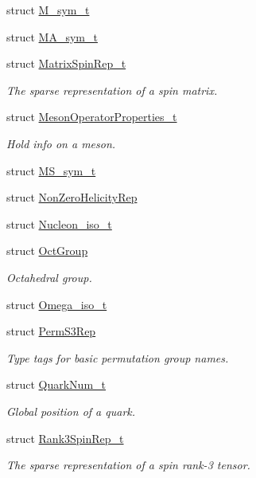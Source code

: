\begin{DoxyCompactItemize}
struct \mbox{\hyperlink{structHadron_1_1M__sym__t}{M\+\_\+sym\+\_\+t}}
\item 
struct \mbox{\hyperlink{structHadron_1_1MA__sym__t}{M\+A\+\_\+sym\+\_\+t}}
\item 
struct \mbox{\hyperlink{structHadron_1_1MatrixSpinRep__t}{Matrix\+Spin\+Rep\+\_\+t}}
\begin{DoxyCompactList}\small\item\em The sparse representation of a spin matrix. \end{DoxyCompactList}\item 
struct \mbox{\hyperlink{structHadron_1_1MesonOperatorProperties__t}{Meson\+Operator\+Properties\+\_\+t}}
\begin{DoxyCompactList}\small\item\em Hold info on a meson. \end{DoxyCompactList}\item 
struct \mbox{\hyperlink{structHadron_1_1MS__sym__t}{M\+S\+\_\+sym\+\_\+t}}
\item 
struct \mbox{\hyperlink{structHadron_1_1NonZeroHelicityRep}{Non\+Zero\+Helicity\+Rep}}
\item 
struct \mbox{\hyperlink{structHadron_1_1Nucleon__iso__t}{Nucleon\+\_\+iso\+\_\+t}}
\item 
struct \mbox{\hyperlink{structHadron_1_1OctGroup}{Oct\+Group}}
\begin{DoxyCompactList}\small\item\em Octahedral group. \end{DoxyCompactList}\item 
struct \mbox{\hyperlink{structHadron_1_1Omega__iso__t}{Omega\+\_\+iso\+\_\+t}}
\item 
struct \mbox{\hyperlink{structHadron_1_1PermS3Rep}{Perm\+S3\+Rep}}
\begin{DoxyCompactList}\small\item\em Type tags for basic permutation group names. \end{DoxyCompactList}\item 
struct \mbox{\hyperlink{structHadron_1_1QuarkNum__t}{Quark\+Num\+\_\+t}}
\begin{DoxyCompactList}\small\item\em Global position of a quark. \end{DoxyCompactList}\item 
struct \mbox{\hyperlink{structHadron_1_1Rank3SpinRep__t}{Rank3\+Spin\+Rep\+\_\+t}}
\begin{DoxyCompactList}\small\item\em The sparse representation of a spin rank-\/3 tensor. \end{DoxyCompactList}\item 

\end{DoxyCompactItemize}
